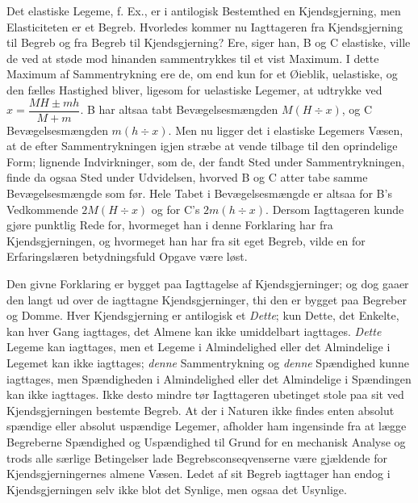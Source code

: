 \documentclass[12pt,a4paper]{book}
\begin{document}
Det elastiske Legeme, f. Ex., er i antilogisk Bestemthed en
Kjendsgjerning, men Elasticiteten er et Begreb. Hvorledes kommer nu
Iagttageren fra Kjendsgjerning til Begreb og fra Begreb til
Kjendsgjerning? Ere, siger han, B og C elastiske, ville de ved at støde
mod hinanden sammentrykkes til et vist Maximum. I dette Maximum af
Sammentrykning ere de, om end kun for et Øieblik, uelastiske, og den
fælles Hastighed bliver, ligesom for uelastiske Legemer, at udtrykke ved
$x = \dfrac{MH \pm mh}{M + m}$. B har altsaa tabt Bevægelsesmængden
$M(H \div x)$, og C Bevægelsesmængden $m (h \div x)$. Men nu ligger det
i elastiske Legemers Væsen, at de efter Sammentrykningen igjen stræbe at
vende tilbage til den oprindelige Form; lignende Indvirkninger, som de,
der fandt Sted under Sammentrykningen, finde da ogsaa Sted under
Udvidelsen, hvorved B og C atter tabe samme Bevægelsesmængde som før.
Hele Tabet i Bevægelsesmængde er altsaa for B's Vedkommende
$2 M (H \div x)$ og for C's $2 m (h \div x)$. Dersom Iagttageren kunde
gjøre punktlig Rede for, hvormeget han i denne Forklaring har fra
Kjendsgjerningen, og hvormeget han har fra sit eget Begreb, vilde en for
Erfaringslæren betydningsfuld Opgave være løst.

Den givne Forklaring er bygget paa Iagttagelse af Kjendsgjerninger; og
dog gaaer den langt ud over de iagttagne Kjendsgjerninger, thi den er
bygget paa Begreber og Domme. Hver Kjendsgjerning er antilogisk et
\emph{Dette}; kun
Dette, det Enkelte, kan hver Gang iagttages, det Almene kan ikke
umiddelbart iagttages. \emph{Dette} Legeme kan iagttages, men et Legeme
i Almindelighed eller det Almindelige i Legemet kan ikke iagttages;
\emph{denne} Sammentrykning og \emph{denne} Spændighed kunne iagttages,
men Spændigheden i Almindelighed eller det Almindelige i Spændingen kan
ikke iagttages. Ikke desto mindre tør Iagttageren ubetinget stole paa
sit ved Kjendsgjerningen bestemte Begreb. At der i Naturen ikke findes
enten absolut spændige eller absolut uspændige Legemer, afholder ham
ingensinde fra at lægge Begreberne Spændighed og Uspændighed til Grund
for en mechanisk Analyse og trods alle særlige Betingelser lade
Begrebsconseqvenserne være gjældende for Kjendsgjerningernes almene
Væsen. Ledet af sit Begreb iagttager han endog i Kjendsgjerningen selv
ikke blot det Synlige, men ogsaa det Usynlige.
\end{document}
